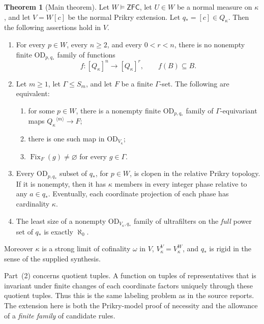 \documentclass[11pt,letterpaper]{article}
\theoremstyle{definition}
\newtheorem{theorem}[definition]{Theorem}
\numberwithin{equation}{section}
\newcommand{\ZFC}{\mathsf{ZFC}}
\newcommand{\OD}{\mathrm{OD}}
\newcommand{\Fk}{\operatorname{Fix}}
\newcommand{\ttuple}[2]{{#1}^{\langle #2\rangle}}
\begin{document}
\begin{theorem}[Main theorem]\label{thm:main}
Let $W\models\ZFC$, let $U\in W$ be a normal measure on $\kappa$, and let
$V=W[c]$ be the normal Prikry extension. Let $q_*=[c]\in Q_\kappa$.
Then the following assertions hold in $V$.
\begin{enumerate}
\item For every $p\in W$, every $n\ge2$, and every $0<r<n$, there is no
nonempty finite $\OD_{p,q_*}$ family of functions
\[
 f:[Q_\kappa]^n\longrightarrow[Q_\kappa]^r,
 \qquad f(B)\subseteq B.
\]
\item Let $m\ge1$, let $\Gamma\le S_m$, and let $F$ be a finite
$\Gamma$-set. The following are equivalent:
\begin{enumerate}[label=(\alph*)]
\item for some $p\in W$, there is a nonempty finite $\OD_{p,q_*}$ family of
$\Gamma$-equivariant maps $\ttuple{Q_\kappa}{m}\to F$;
\item there is one such map in $\OD_{V_\kappa}$;
\item $\Fk_F(g)\ne\varnothing$ for every $g\in\Gamma$.
\end{enumerate}
\item Every $\OD_{p,q_*}$ subset of $q_*$, for $p\in W$, is clopen in the
relative Prikry topology. If it is nonempty, then it has $\kappa$ members in
every integer phase relative to any $a\in q_*$. Eventually, each coordinate
projection of each phase has cardinality $\kappa$.
\item The least size of a nonempty $\OD_{V_\kappa,q_*}$ family of ultrafilters
on the \emph{full} power set of $q_*$ is exactly $\aleph_0$.
\end{enumerate}
Moreover $\kappa$ is a strong limit of cofinality $\omega$ in $V$,
$V_\kappa^V=V_\kappa^W$, and $q_*$ is rigid in the sense of the supplied
synthesis.
\end{theorem}

Part~(2) concerns quotient tuples. A function on tuples of representatives
that is invariant under finite changes of each coordinate factors uniquely
through these quotient tuples. Thus this is the same labeling problem as in
the source reports. The extension here is both the Prikry-model proof of
necessity and the allowance of a \emph{finite family} of candidate rules.
\end{document}
